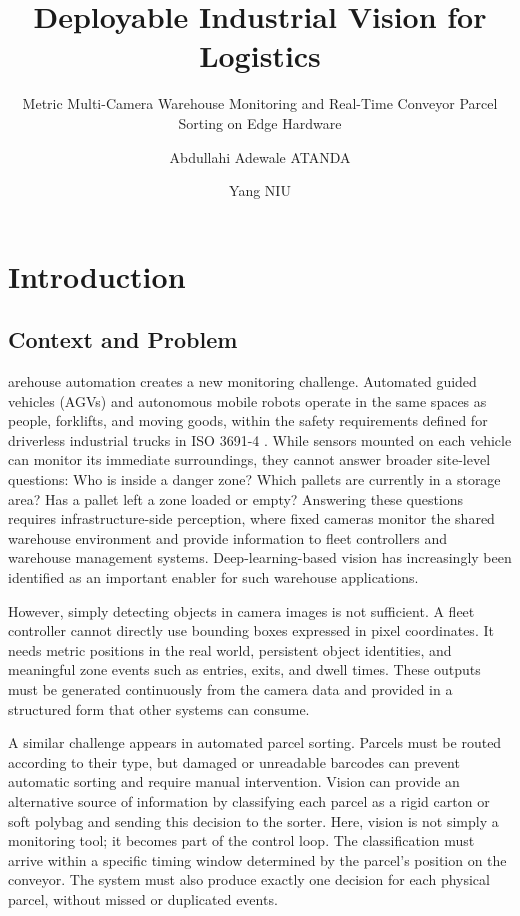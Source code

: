 \documentclass[9pt,a4paper,twocolumn]{rho-class/rho}
\title{Deployable Industrial Vision for Logistics}
\subtitle{Metric Multi-Camera Warehouse Monitoring and Real-Time Conveyor Parcel Sorting on Edge Hardware}
\author[a,1]{Abdullahi Adewale ATANDA}
\author[b,2]{Yang NIU}
\affil[a]{Universit\'e Grenoble Alpes, Grenoble, France}
\affil[b]{ISITEC International, France}
\begin{document}
    \maketitle
    \thispagestyle{firststyle}


\section{Introduction}

\subsection{Context and Problem}

arehouse automation creates a new monitoring challenge. Automated guided vehicles (AGVs) and autonomous mobile robots operate in the same spaces as people, forklifts, and moving goods, within the safety requirements defined for driverless industrial trucks in ISO 3691-4 \cite{iso36914}. While sensors mounted on each vehicle can monitor its immediate surroundings, they cannot answer broader site-level questions: Who is inside a danger zone? Which pallets are currently in a storage area? Has a pallet left a zone loaded or empty? Answering these questions requires infrastructure-side perception, where fixed cameras monitor the shared warehouse environment and provide information to fleet controllers and warehouse management systems. Deep-learning-based vision has increasingly been identified as an important enabler for such warehouse applications.

However, simply detecting objects in camera images is not sufficient. A fleet controller cannot directly use bounding boxes expressed in pixel coordinates. It needs metric positions in the real world, persistent object identities, and meaningful zone events such as entries, exits, and dwell times. These outputs must be generated continuously from the camera data and provided in a structured form that other systems can consume.

A similar challenge appears in automated parcel sorting. Parcels must be routed according to their type, but damaged or unreadable barcodes can prevent automatic sorting and require manual intervention. Vision can provide an alternative source of information by classifying each parcel as a rigid carton or soft polybag and sending this decision to the sorter. Here, vision is not simply a monitoring tool; it becomes part of the control loop. The classification must arrive within a specific timing window determined by the parcel's position on the conveyor. The system must also produce exactly one decision for each physical parcel, without missed or duplicated events.
\end{document}
